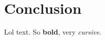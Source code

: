 \documentclass[Main]{subfiles}
\begin{document}
\section{Conclusion} %
	\label{sec:conclusion}

	Lol text.
	So \textbf{bold}, very \emph{cursive}.

\end{document}
